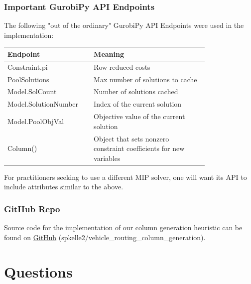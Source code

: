 \documentclass{beamer}
\begin{document}
	\begin{frame}[t]
		\frametitle{Important GurobiPy API Endpoints}
		\small
		\vspace{-.25cm}
		The following "out of the ordinary" GurobiPy API Endpoints were used in the implementation:
		\vspace{.25cm}
		\begin{table}[ht]
			\centering
			\begin{tabular}{|p{0.3\linewidth}|p{0.5\linewidth}|}
				\hline
				\textbf{Endpoint} & \textbf{Meaning} \\ 
				\hline
				Constraint.pi & Row reduced costs \\ 
				\hline
				PoolSolutions & Max number of solutions to cache \\ 
				\hline
				Model.SolCount & Number of solutions cached \\ 
				\hline
				Model.SolutionNumber & Index of the current solution \\ 
				\hline
				Model.PoolObjVal & Objective value of the current solution \\
				\hline
				Column() & Object that sets nonzero constraint coefficients for new variables \\ 
				\hline
			\end{tabular}
		\end{table}
		\vspace{1cm}
		\begin{block}{}
			For practitioners seeking to use a different MIP solver, one will want its API to include attributes similar to the above.
		\end{block}
		\normalsize
	\end{frame}

	\begin{frame}[t]
		\frametitle{GitHub Repo}
		\small
		Source code for the implementation of our column generation heuristic can be found on \textcolor{blue}{\href{https://github.com/spkelle2/vehicle_routing_column_generation}{GitHub}} (spkelle2/vehicle\_routing\_column\_generation).
		\normalsize
	\end{frame}

	\section{Questions}
		
\end{document}
